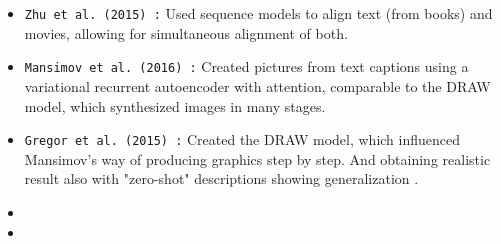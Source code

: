 \begin{itemize}[noitemsep]
    \item \texttt{Zhu et al. (2015) :}
    Used sequence models to align text (from books) and movies, allowing for simultaneous alignment of both.

    \item \texttt{Mansimov et al. (2016) :}
    Created pictures from text captions using a variational recurrent autoencoder with attention, 
    comparable to the DRAW model, which synthesized images in many stages.

    \item \texttt{Gregor et al. (2015) :}
    Created the DRAW model, which influenced Mansimov's way of producing graphics step by step.
    And obtaining realistic result also with "zero-shot" descriptions showing generalization . 

    \item \texttt{}
    \item \texttt{}


\end{itemize}

